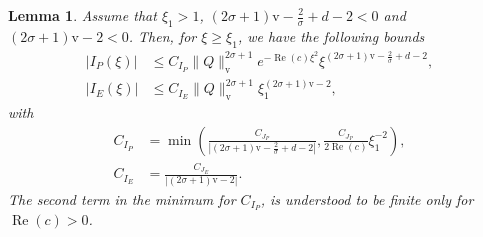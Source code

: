 \documentclass[11pt]{article}
\DeclareMathOperator{\real}{Re}
\newcommand{\normv}{\mathrm{v}}
\newtheorem{lemma}[definition]{Lemma}
\begin{document}
\begin{lemma}\label{lemma:I_P-I_E}
  Assume that \(\xi_{1} > 1\),
  \((2\sigma + 1)\normv - \frac{2}{\sigma} + d - 2 < 0\) and
  \((2\sigma + 1)\normv - 2 < 0\). Then, for \(\xi \geq \xi_{1}\), we
  have the following bounds
  \begin{align*}
    |I_{P}(\xi)| &\leq C_{I_{P}}\|Q\|_{\normv}^{2\sigma + 1}e^{-\real(c)\xi^{2}}\xi^{(2\sigma + 1)\normv - \frac{2}{\sigma} + d - 2},\\
    |I_{E}(\xi)| &\leq C_{I_{E}}\|Q\|_{\normv}^{2\sigma + 1}\xi_{1}^{(2\sigma + 1)\normv - 2},
  \end{align*}
  with
  \begin{align*}
    C_{I_{P}} &= \min\left(\frac{C_{J_{P}}}{|(2\sigma + 1)\normv - \frac{2}{\sigma} + d - 2|}, \frac{C_{J_{P}}}{2\real(c)}\xi_{1}^{-2}\right),\\
    C_{I_{E}} &= \frac{C_{J_{E}}}{|(2\sigma + 1)\normv - 2|}.
  \end{align*}
  The second term in the minimum for \(C_{I_{P}}\), is understood to
  be finite only for \(\real(c) > 0\).
\end{lemma}
\end{document}
